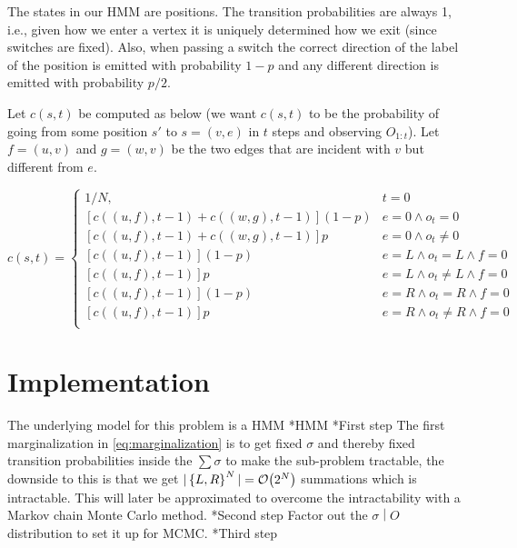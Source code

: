 \documentclass[a4paper,11pt]{kth-mag}
\begin{document}
    The states in our HMM are positions. The transition probabilities are
    always 1, i.e., given how we enter a vertex it is uniquely determined how
    we exit (since switches are fixed). Also, when passing a switch the correct
    direction of the label of the position is emitted with probability $1-p$
    and any different direction is emitted with probability $p/2$.

    Let $c(s,t)$ be computed as below (we want $c(s,t)$ to be the probability
    of going from some position $s'$ to $s=(v,e)$ in $t$ steps and observing
    $O_{1:t}$). Let $f=(u,v)$ and $g=(w,v)$ be the two edges that are incident
    with $v$ but different from $e$.

    \begin{equation}
        c(s,t) =
        \begin{cases}
            1/N, & t = 0 \\
            \left[c((u,f),t-1) + c((w,g),t-1)\right](1-p) & e = 0 \wedge o_t = 0 \\
            \left[c((u,f),t-1) + c((w,g),t-1)\right]p     & e = 0 \wedge o_t \neq 0 \\
            \left[c((u,f),t-1)               \right](1-p) & e = L \wedge o_t = L \wedge f = 0 \\
            \left[c((u,f),t-1)               \right]p     & e = L \wedge o_t \neq L \wedge f = 0 \\
            \left[c((u,f),t-1)               \right](1-p) & e = R \wedge o_t = R \wedge f = 0 \\
            \left[c((u,f),t-1)               \right]p     & e = R \wedge o_t \neq R \wedge f = 0 \\
        \end{cases}
    \end{equation}

    \chapter{Implementation}
        The underlying model for this problem is a HMM
        *HMM
            *First step
                The first marginalization in \eqref{eq:marginalization} is 
                to get fixed $\sigma$ and thereby fixed transition 
                probabilities inside the $\sum\limits\sigma$ to make the 
                sub-problem tractable, the downside to this is that we get 
                $|\left\{{L,R}\right\}^N| = \mathcal{O}{\left(2^N\right)}$ summations which is intractable. 
                This will later be approximated to overcome the intractability with a 
                Markov chain Monte Carlo method. 
            *Second step
                Factor out the $\left.\sigma \middle\vert O\right.$ distribution to set it up for MCMC.
            *Third step
                
\end{document}
